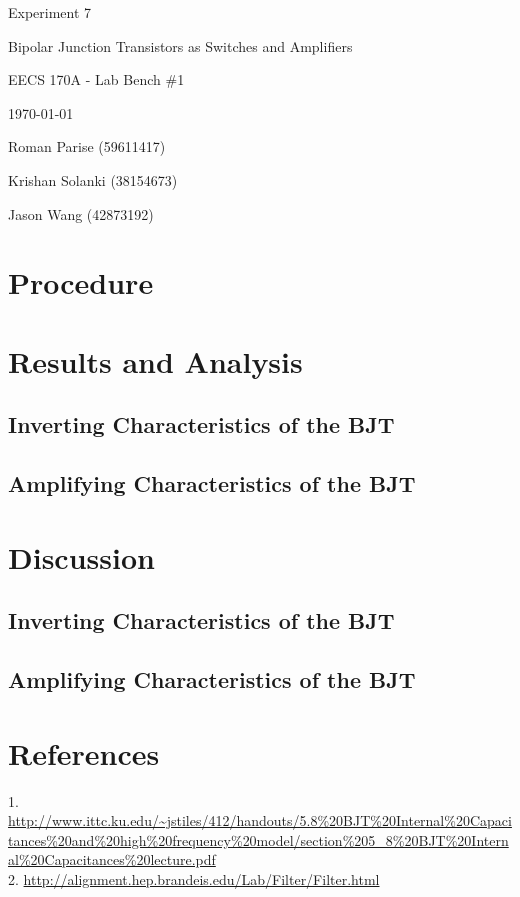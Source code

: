\documentclass{article}
\begin{document}
\begin{titlepage}
	\centering
	\vspace{2.5cm}
	{\huge Experiment 7 \par}
	{\LARGE Bipolar Junction Transistors as Switches and Amplifiers \par}
	{\Large EECS 170A - Lab Bench \#1 \par}
	{\Large \today \par}
	\vspace{1cm}
	{\large Roman Parise (59611417) \par}
	{\large Krishan Solanki (38154673) \par}
	{\large Jason Wang (42873192) \par}
	\vspace{1cm}
\end{titlepage}
\section{Procedure}

\section{Results and Analysis}
\subsection{Inverting Characteristics of the BJT}

\subsection{Amplifying Characteristics of the BJT}

\section{Discussion}
\subsection{Inverting Characteristics of the BJT}

\subsection{Amplifying Characteristics of the BJT}

\section{References}
1. \url{http://www.ittc.ku.edu/~jstiles/412/handouts/5.8\%20BJT\%20Internal\%20Capacitances\%20and\%20high\%20frequency\%20model/section\%205_8\%20BJT\%20Internal\%20Capacitances\%20lecture.pdf} \\ %
2. \url{http://alignment.hep.brandeis.edu/Lab/Filter/Filter.html} \\ %
\end{document}
